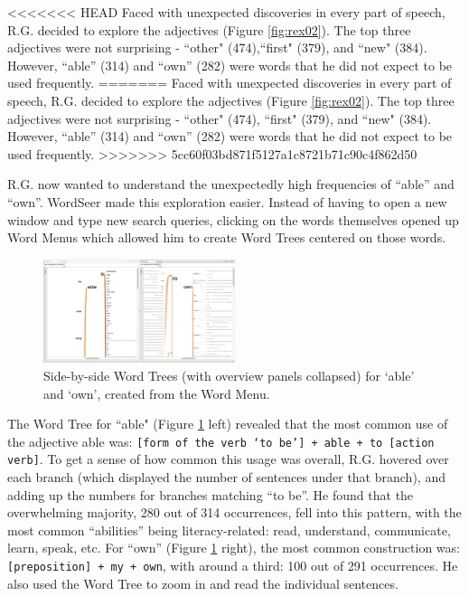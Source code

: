 \documentclass{sig-alternate}
\newcommand{\code}[1] {\texttt{#1}}
\begin{document}
\begin{enumerate}
<<<<<<< HEAD
Faced with unexpected discoveries in every part of speech, R.G. decided to explore the adjectives (Figure \ref{fig:rex02}). The top three adjectives were not surprising - ``other" (474),``first" (379), and ``new" (384).  However,  ``able'' (314) and ``own'' (282) were words that he did not expect to be used frequently.
=======
Faced with unexpected discoveries in every part of speech, R.G. decided to explore the adjectives (Figure \ref{fig:rex02}). The top three adjectives were not surprising - ``other" (474), ``first" (379), and ``new" (384).  However,  ``able'' (314) and ``own'' (282) were words that he did not expect to be used frequently.
>>>>>>> 5cc60f03bd871f5127a1c8721b71c90c4f862d50

R.G. now wanted to understand the unexpectedly high frequencies of ``able'' and ``own''. WordSeer made this exploration easier. Instead of having to open a new window and type new search queries, clicking on the words themselves opened up Word Menus which allowed him to create Word Trees centered on those words.

\begin{figure}[h!]
\includegraphics[width=0.5\textwidth]{fig/rex/04.png}
\caption{ Side-by-side Word Trees (with overview panels collapsed) for `able' and `own', created from the Word Menu. \label{fig:rex04}}
\end{figure}

The Word Tree for ``able" (Figure \ref{fig:rex04} left) revealed that the most common use of the adjective able was: \code{[form of the verb `to be'] + able + to [action verb]}. To get a sense of how common this usage was overall, R.G. hovered over each branch (which displayed the number of sentences under that branch), and adding up the numbers for branches matching ``to be''. He found that the overwhelming majority, 280 out of 314 occurrences, fell into this pattern, with the most common ``abilities'' being literacy-related: read, understand, communicate, learn, speak, etc. For  ``own'' (Figure \ref{fig:rex04} right), the most common construction was: \code{[preposition] + my + own}, with around a third: 100 out of 291 occurrences.  He also used the Word Tree to zoom in and read the individual sentences.


\end{enumerate}
\end{document}
